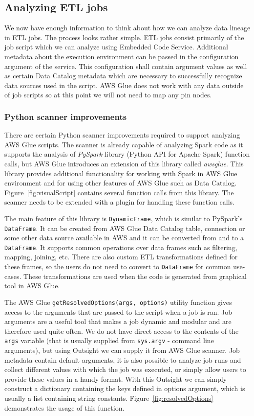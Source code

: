 \subsection{Analyzing ETL jobs}
We now have enough information to think about how we can analyze data lineage in ETL jobs. The process looks rather simple. ETL jobs consist primarily of the job script which we can analyze using Embedded Code Service. Additional metadata about the execution environment can be passed in the configuration argument of the service. This configuration shall contain argument values as well as certain Data Catalog metadata which are necessary to successfully recognize data sources used in the script. AWS Glue does not work with any data outside of job scripts so at this point we will not need to map any pin nodes.

\subsubsection{Python scanner improvements}
\label{sec:python}
There are certain Python scanner improvements required to support analyzing AWS Glue scripts. The scanner is already capable of analyzing Spark code as it supports the analysis of \textit{PySpark} library (Python API for Apache Spark) function calls, but AWS Glue introduces an extension of this library called \textit{awsglue}. This library provides additional functionality for working with Spark in AWS Glue environment and for using other features of AWS Glue such as Data Catalog. Figure~\ref{fig:visualScript} contains several function calls from this library. The scanner needs to be extended with a plugin for handling these function calls.
\par
The main feature of this library is \texttt{DynamicFrame}, which is similar to PySpark's \texttt{DataFrame}. It can be created from AWS Glue Data Catalog table, connection or some other data source available in AWS and it can be converted from and to a \texttt{DataFrame}. It supports common operations over data frames such as filtering, mapping, joining, etc. There are also custom ETL transformations defined for these frames, so the users do not need to convert to \texttt{DataFrame} for common use-cases. These transformations are used when the code is generated from graphical tool in AWS Glue.
\par
The AWS Glue \texttt{getResolvedOptions(args, options)} utility function gives access to the arguments that are passed to the script when a job is ran. Job arguments are a useful tool that makes a job dynamic and modular and are therefore used quite often. We do not have direct access to the contents of the \texttt{args} variable (that is usually supplied from \texttt{sys.argv} - command line arguments), but using Outsight we can supply it from AWS Glue scanner. Job metadata contain default arguments, it is also possible to analyze job runs and collect different values with which the job was executed, or simply allow users to provide these values in a handy format. With this Outsight we can simply construct a dictionary containing the keys defined in options argument, which is usually a list containing string constants. Figure~\ref{fig:resolvedOptions} demonstrates the usage of this function.
